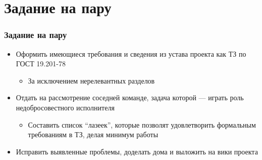 \documentclass[xetex,mathserif,serif]{beamer}
\begin{document}
	\section{Задание на пару}

	\begin{frame}
		\frametitle{Задание на пару}
		\begin{itemize}
			\item Оформить имеющиеся требования и сведения из устава проекта как ТЗ по ГОСТ 19.201-78
			\begin{itemize}
				\item За исключением нерелевантных разделов
			\end{itemize}
			\item Отдать на рассмотрение соседней команде, задача которой --- играть роль недобросовестного исполнителя
			\begin{itemize}
				\item Составить список ``лазеек'', которые позволят удовлетворить формальным требованиям в ТЗ, делая минимум работы
			\end{itemize}
			\item Исправить выявленные проблемы, доделать дома и выложить на вики проекта
		\end{itemize}
	\end{frame}
\end{document}
